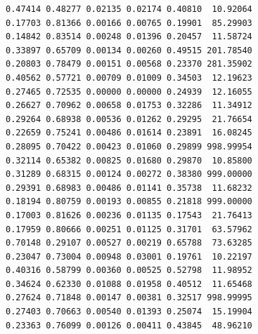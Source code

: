 \documentclass[12pt,letterpaper]{article}\usepackage[]{graphicx}\usepackage[]{color}
\begin{document}
\begin{lstlisting}
0.47414 0.48277 0.02135 0.02174 0.40810  10.92064
0.17703 0.81366 0.00166 0.00765 0.19901  85.29903
0.14842 0.83514 0.00248 0.01396 0.20457  11.58724
0.33897 0.65709 0.00134 0.00260 0.49515 201.78540
0.20803 0.78479 0.00151 0.00568 0.23370 281.35902
0.40562 0.57721 0.00709 0.01009 0.34503  12.19623
0.27465 0.72535 0.00000 0.00000 0.24939  12.16055
0.26627 0.70962 0.00658 0.01753 0.32286  11.34912
0.29264 0.68938 0.00536 0.01262 0.29295  21.76654
0.22659 0.75241 0.00486 0.01614 0.23891  16.08245
0.28095 0.70422 0.00423 0.01060 0.29899 998.99954
0.32114 0.65382 0.00825 0.01680 0.29870  10.85800
0.31289 0.68315 0.00124 0.00272 0.38380 999.00000
0.29391 0.68983 0.00486 0.01141 0.35738  11.68232
0.18194 0.80759 0.00193 0.00855 0.21818 999.00000
0.17003 0.81626 0.00236 0.01135 0.17543  21.76413
0.17959 0.80666 0.00251 0.01125 0.31701  63.57962
0.70148 0.29107 0.00527 0.00219 0.65788  73.63285
0.23047 0.73004 0.00948 0.03001 0.19761  10.22197
0.40316 0.58799 0.00360 0.00525 0.52798  11.98952
0.34624 0.62330 0.01088 0.01958 0.40512  11.65468
0.27624 0.71848 0.00147 0.00381 0.32517 998.99995
0.27403 0.70663 0.00540 0.01393 0.25074  15.19904
0.23363 0.76099 0.00126 0.00411 0.43845  48.96210

\end{lstlisting}
\end{document}
